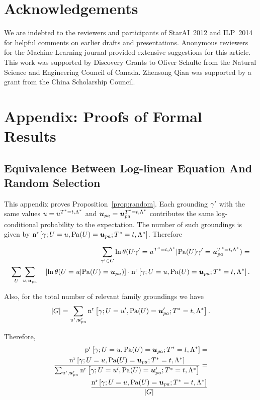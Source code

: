 \documentclass[runningheads,a4paper]{llncs}
\renewcommand{\Qconj}{\Appendterm{\FG{\TT} = \TV} {\QC}} %
\begin{document}
\section*{Acknowledgements} 
We are indebted to the reviewers and participants of StarAI~2012 and ILP~2014 for helpful comments on earlier drafts and presentations. Anonymous reviewers for the Machine Learning journal provided extensive suggestions for this article.
This work was supported by Discovery Grants to Oliver Schulte from the Natural Science and Engineering Council of Canada. Zhensong Qian was supported by a grant from the China Scholarship Council. 

\section{Appendix: Proofs of Formal Results}

\subsection{Equivalence Between Log-linear Equation And Random Selection} \label{sec:random-proof}

This appendix proves Proposition~\ref{prop:random}. Each grounding $\gamma'$ with the same values  $\UV = \UV^{\Qconj}$ and $\Prange{\UT} = \Prange{\UT}^{\Qconj}$ contributes the same log-conditional probability to the expectation. The number of such groundings is given by $\Relcount{\Appendterm{\grounding;\UT  = \UV} {\Pa{\UT} = \Prange{\UT}}} {\Qconj}$. 
Therefore

\begin{align*} \label{eq:number groundings}
\sum_{\grounding' \in G} \ln \cprob{\UT \grounding' = \UV^{\Qconj}}{\Pa{\UT} \grounding' = \Prange{\UT}^{\Qconj}} =
\\
 \sum_{\UT} \sum_{\UV,\Prange{\UT}}   \quad \left[ \ln \cprob{\UT = \UV}{\Pa{\UT} = \Prange{\UT}} \right] 
 \cdot 
\Relcount{\Appendterm{\grounding;\UT  = \UV} {\Pa{\UT} = \Prange{\UT}}} {\Qconj}.
\end{align*}


Also, for the total number of relevant family groundings we have $$|G| = \sum_{\UV',\Prange{\UT}'}\Relcount{\Appendterm{\grounding;\UT  = \UV'} {\Pa{\UT} = \Prange{\UT}'}} {\Qconj}.$$ 

Therefore, 
\begin{align*} 
 \Relfreq{\Appendterm{\grounding;\UT  = \UV} {\Pa{\UT} = \Prange{\UT}}} {\Qconj} = 
 \\ 
 \frac{\Relcount{\Appendterm{\grounding;\UT  = \UV} {\Pa{\UT} = \Prange{\UT}}} {\Qconj}}
 {\sum_{\UV',\Prange{\UT}'}\Relcount{\Appendterm{\grounding;\UT  = \UV'} {\Pa{\UT} = \Prange{\UT}'}} {\Qconj}} =\\
 \frac
 {\Relcount{\Appendterm{\grounding;\UT  = \UV} {\Pa{\UT} = \Prange{\UT}}} {\Qconj}}
 {|G|}
\end{align*}
\end{document}
